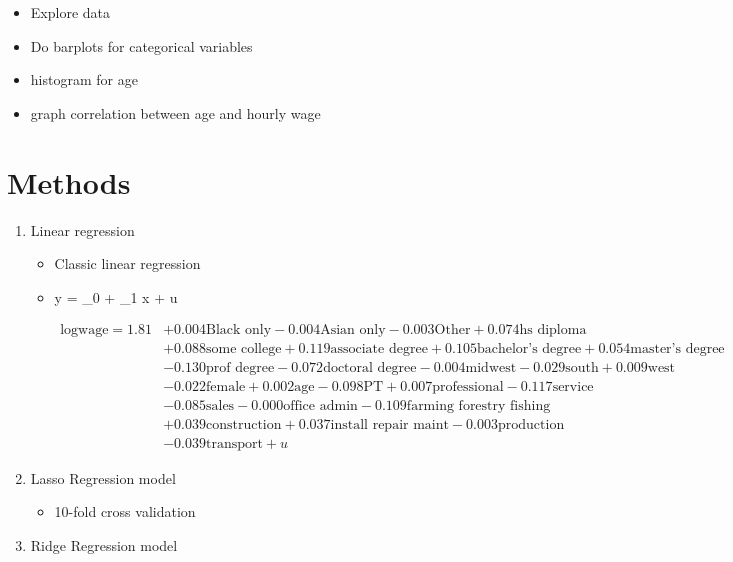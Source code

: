 \documentclass{article}
\begin{document}
\begin{itemize}
\item Explore data
\item Do barplots for categorical variables
\item histogram for age
\item graph correlation between age and hourly wage
\end{itemize}

\section{Methods}
\begin{enumerate}
\item Linear regression
\begin{itemize}
\item Classic linear regression
\item y = \beta_0 + \beta_1 x + u


\begin{equation}
\begin{split}
\text{logwage} = 1.81 & + 0.004\text{Black only} - 0.004\text{Asian only} - 0.003\text{Other} + 0.074\text{hs diploma} \\
& + 0.088\text{some college} + 0.119\text{associate degree} + 0.105\text{bachelor’s degree} + 0.054\text{master’s degree} \\
& - 0.130\text{prof degree} - 0.072\text{doctoral degree} - 0.004\text{midwest} - 0.029\text{south} + 0.009\text{west} \\
& - 0.022\text{female} + 0.002\text{age} 
 - 0.098\text{PT} + 0.007\text{professional} - 0.117 \text{service}\\
& - 0.085 \text{sales}- 0.000 \text{office admin}- 0.109 \text{farming forestry fishing}\\
&+ 0.039 \text{construction}+ 0.037 \text{install repair maint}- 0.003 \text{production}\\
&- 0.039 \text{transport}+ u
\end{split}
\end{equation}


\end{itemize}
\item Lasso Regression model
\begin{itemize}
\item 10-fold cross validation
\end{itemize}
\item Ridge Regression model
\end{enumerate}
\end{document}
